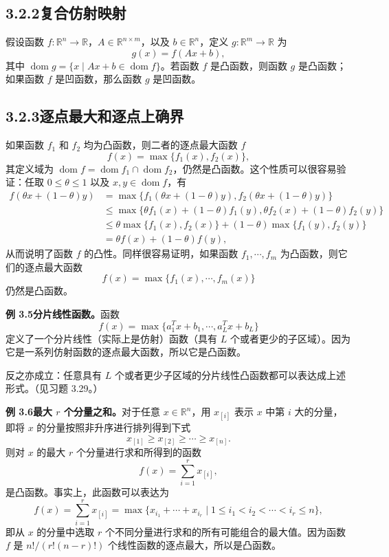 \documentclass[UTF8,12pt,a4paper,fontset=fandol]{ctexart}
\DeclareMathOperator{\dom}{dom}
\begin{document}
\subsection*{3.2.2\quad 复合仿射映射}

假设函数 $f:\mathbb{R}^n\to\mathbb{R}$，$A\in\mathbb{R}^{n\times m}$，以及 $b\in\mathbb{R}^n$，定义 $g:\mathbb{R}^m\to\mathbb{R}$ 为
\[
g(x)=f(Ax+b),
\]
其中 $\dom g=\{x\mid Ax+b\in\dom f\}$。若函数 $f$ 是凸函数，则函数 $g$ 是凸函数；如果函数 $f$ 是凹函数，那么函数 $g$ 是凹函数。

\subsection*{3.2.3\quad 逐点最大和逐点上确界}

如果函数 $f_1$ 和 $f_2$ 均为凸函数，则二者的逐点最大函数 $f$
\[
f(x)=\max\{f_1(x),f_2(x)\},
\]
其定义域为 $\dom f=\dom f_1\cap\dom f_2$，仍然是凸函数。这个性质可以很容易验证：任取 $0\leq\theta\leq1$ 以及 $x,y\in\dom f$，有
\[
\begin{aligned}
f(\theta x+(1-\theta)y)
&=\max\{f_1(\theta x+(1-\theta)y),f_2(\theta x+(1-\theta)y)\}\\
&\leq \max\{\theta f_1(x)+(1-\theta)f_1(y),\theta f_2(x)+(1-\theta)f_2(y)\}\\
&\leq \theta\max\{f_1(x),f_2(x)\}+(1-\theta)\max\{f_1(y),f_2(y)\}\\
&=\theta f(x)+(1-\theta)f(y),
\end{aligned}
\]
从而说明了函数 $f$ 的凸性。同样很容易证明，如果函数 $f_1,\cdots,f_m$ 为凸函数，则它们的逐点最大函数
\[
f(x)=\max\{f_1(x),\cdots,f_m(x)\}
\]
仍然是凸函数。

\noindent\textbf{例 3.5\quad 分片线性函数。}\quad 函数
\[
f(x)=\max\{a_1^Tx+b_1,\cdots,a_L^Tx+b_L\}
\]
定义了一个分片线性（实际上是仿射）函数（具有 $L$ 个或者更少的子区域）。因为它是一系列仿射函数的逐点最大函数，所以它是凸函数。

反之亦成立：任意具有 $L$ 个或者更少子区域的分片线性凸函数都可以表达成上述形式。（见习题 3.29。）

\noindent\textbf{例 3.6\quad 最大 $r$ 个分量之和。}\quad 对于任意 $x\in\mathbb{R}^n$，用 $x_{[i]}$ 表示 $x$ 中第 $i$ 大的分量，即将 $x$ 的分量按照非升序进行排列得到下式
\[
x_{[1]}\geq x_{[2]}\geq \cdots\geq x_{[n]}.
\]
则对 $x$ 的最大 $r$ 个分量进行求和所得到的函数
\[
f(x)=\sum_{i=1}^r x_{[i]},
\]
是凸函数。事实上，此函数可以表达为
\[
f(x)=\sum_{i=1}^r x_{[i]}=
\max\{x_{i_1}+\cdots+x_{i_r}\mid 1\leq i_1<i_2<\cdots<i_r\leq n\},
\]
即从 $x$ 的分量中选取 $r$ 个不同分量进行求和的所有可能组合的最大值。因为函数 $f$ 是 $n!/(r!(n-r)!)$ 个线性函数的逐点最大，所以是凸函数。
\end{document}
